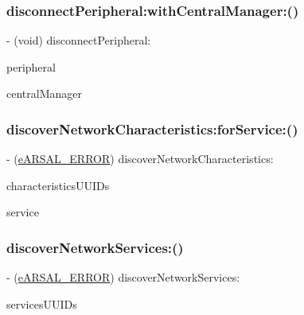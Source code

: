 \subsubsection{\texorpdfstring{disconnect\+Peripheral\+:with\+Central\+Manager\+:()}{disconnectPeripheral:withCentralManager:()}}
{\footnotesize\ttfamily -\/ (void) disconnect\+Peripheral\+: \begin{DoxyParamCaption}\item[{(C\+B\+Peripheral $\ast$)}]{peripheral }\item[{withCentralManager:(\hyperlink{interfaceARSAL__CentralManager}{A\+R\+S\+A\+L\+\_\+\+Central\+Manager} $\ast$)}]{central\+Manager }\end{DoxyParamCaption}}

\hypertarget{interfaceARSAL__BLEManager_ae0cdcbf690a6b37b5aa440338eedea3d}{}\label{interfaceARSAL__BLEManager_ae0cdcbf690a6b37b5aa440338eedea3d} 
\subsubsection{\texorpdfstring{discover\+Network\+Characteristics\+:for\+Service\+:()}{discoverNetworkCharacteristics:forService:()}}
{\footnotesize\ttfamily -\/ (\hyperlink{ARSAL__Error_8h_a95978608019620b9d7e573ad874e5889}{e\+A\+R\+S\+A\+L\+\_\+\+E\+R\+R\+OR}) discover\+Network\+Characteristics\+: \begin{DoxyParamCaption}\item[{(N\+S\+Array $\ast$)}]{characteristics\+U\+U\+I\+Ds }\item[{forService:(C\+B\+Service $\ast$)}]{service }\end{DoxyParamCaption}}

\hypertarget{interfaceARSAL__BLEManager_afe64e431550c1a417f8c4bba8725e5cd}{}\label{interfaceARSAL__BLEManager_afe64e431550c1a417f8c4bba8725e5cd} 
\subsubsection{\texorpdfstring{discover\+Network\+Services\+:()}{discoverNetworkServices:()}}
{\footnotesize\ttfamily -\/ (\hyperlink{ARSAL__Error_8h_a95978608019620b9d7e573ad874e5889}{e\+A\+R\+S\+A\+L\+\_\+\+E\+R\+R\+OR}) discover\+Network\+Services\+: \begin{DoxyParamCaption}\item[{(N\+S\+Array $\ast$)}]{services\+U\+U\+I\+Ds }\end{DoxyParamCaption}}

